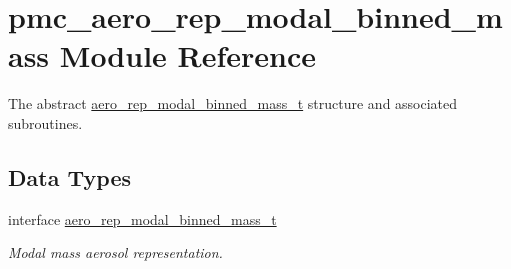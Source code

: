 \hypertarget{namespacepmc__aero__rep__modal__binned__mass}{}\section{pmc\+\_\+aero\+\_\+rep\+\_\+modal\+\_\+binned\+\_\+mass Module Reference}
\label{namespacepmc__aero__rep__modal__binned__mass}


The abstract \mbox{\hyperlink{structpmc__aero__rep__modal__binned__mass_1_1aero__rep__modal__binned__mass__t}{aero\+\_\+rep\+\_\+modal\+\_\+binned\+\_\+mass\+\_\+t}} structure and associated subroutines.  


\subsection*{Data Types}
\begin{DoxyCompactItemize}
\item 
interface \mbox{\hyperlink{structpmc__aero__rep__modal__binned__mass_1_1aero__rep__modal__binned__mass__t}{aero\+\_\+rep\+\_\+modal\+\_\+binned\+\_\+mass\+\_\+t}}
\begin{DoxyCompactList}\small\item\em Modal mass aerosol representation. \end{DoxyCompactList}\end{DoxyCompactItemize}
